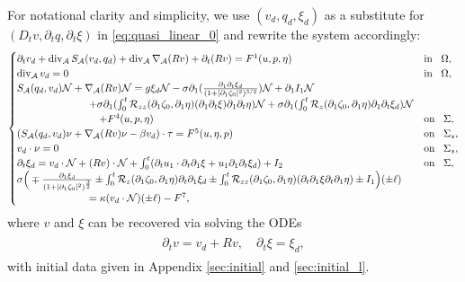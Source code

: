 \documentclass[letterpaper,reqno,10pt,twoside]{amsart}
\theoremstyle{definition}
\theoremstyle{remark}
\def\p{\partial}
\def\dive{\mathop{\rm div}\nolimits}
\begin{document}
	For notational clarity and simplicity, we use $(v_{d},q_{d},\xi_{d})$ as a substitute for $(D_{t}v,\partial_{t}q,\partial_{t}\xi)$ in \eqref{eq:quasi_linear_0} and rewrite the system accordingly:
	\begin{equation}\label{eq:quasi_linear}
		\begin{cases}
			\partial_{t}v_{d}+\operatorname{div}_{\mathcal{A}}S_{\mathcal{A}}(v_{d},q_{d})+\dive_{\mathcal{A}}\nabla_{\mathcal{A}}(Rv)+\p_{t}(Rv)=F^{1}(u,p,\eta)~~~&\operatorname{in}~~\Omega,\\
			\operatorname{div}_{\mathcal{A}}v_{d}=0~~~&\operatorname{in}~~\Omega,\\
			S_{\mathcal{A}}(q_{d},v_{d})\mathcal{N}+\nabla_{\mathcal{A}}(Rv)\mathcal{N}=g\xi_{d}\mathcal{N}-\sigma\partial_{1}(\frac{\p_1\p_t\xi_d}{(1+\vert \partial_{1}\zeta_{0}\vert^{2})^{3/2}})\mathcal{N}+\p_{1}I_{1}\mathcal{N}\\
			\quad\quad\quad\quad\quad\quad\quad+\sigma\partial_{1}(\int_{0}^{t}\mathcal{R}_{zz}(\partial_{1}\zeta_{0},\partial_{1}\eta)(\partial_{1}\p_{t}\xi)\p_{1}\p_{t}\eta)\mathcal{N}+\sigma\partial_{1}(\int_{0}^{t}\mathcal{R}_{z}(\partial_{1}\zeta_{0},\partial_{1}\eta)\partial_{1}\partial_{t}\xi_{d})\mathcal{N}\\
			\quad\quad\quad\quad\quad\quad\quad\quad+F^{4}(u,p,\eta)~~~&\operatorname{on}~~\Sigma,\\
			(S_{\mathcal{A}}(q_{d},v_{d})\nu+\nabla_{\mathcal{A}}(Rv)\nu-\beta v_{d})\cdot \tau=F^{5}(u,\eta,p)~~~&\operatorname{on}~~\Sigma_{s},\\
			v_{d}\cdot \nu=0~~~&\operatorname{on}~~\Sigma_{s},\\
			\partial_{t}\xi_{d}=v_{d}\cdot \mathcal{N}+(Rv)\cdot \mathcal{N}+\int_{0}^{t}(\partial_{t}u_{1}\cdot\partial_{t}\p_{1}\xi+u_{1}\partial_{1}\partial_{t}\xi_{d})+I_{2}~~~&\operatorname{on}~~\Sigma,\\
			\sigma \Big(\mp \frac{\partial_{1}\xi_{d}}{(1+\vert \partial_{1}\zeta_{0}\vert^{2})^{\frac{3}{2}}}\pm \int_{0}^{t}\mathcal{R}_{z}(\partial_{1}\zeta_{0},\partial_{1}\eta)\partial_{t}\partial_{1}\xi_{d}\pm\int_{0}^{t}\mathcal{R}_{zz}(\p_{1}\zeta_{0},\p_{1}\eta)(\p_{t}\p_{1}\xi\p_{t}\p_{1}\eta)\pm I_{1} \Big)(\pm \ell)\\
			\quad\quad\quad\quad\quad\quad\quad=\kappa (v_{d}\cdot \mathcal{N})(\pm \ell)-{F}^{7},
		\end{cases}
	\end{equation}
	\noindent where $v$ and $\xi$ can be recovered via solving the ODEs
	\begin{align}\label{eq:quasi_linear2}
		\begin{aligned}
			\p_{t}v=v_{d}+Rv,\quad \p_{t}\xi=\xi_{d},
		\end{aligned}
	\end{align}
	\noindent with initial data given in Appendix \ref{sec:initial} and \ref{sec:initial_l}. 
	
\end{document}
